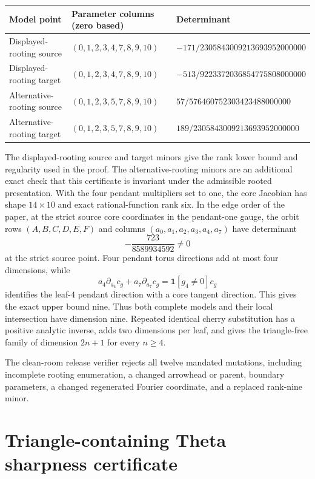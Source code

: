 \documentclass[11pt]{article}
\begin{document}
\begin{center}
\scriptsize
\begin{tabular}{@{}p{.25\linewidth}p{.30\linewidth}p{.34\linewidth}@{}}
\toprule
Model point & Parameter columns (zero based) & Determinant\\
\midrule
Displayed-rooting source
& $(0,1,2,3,4,7,8,9,10)$
& $-171/2305843009213693952000000$\\
Displayed-rooting target
& $(0,1,2,3,4,7,8,9,10)$
& $-513/9223372036854775808000000$\\
Alternative-rooting source
& $(0,1,2,3,5,7,8,9,10)$
& $57/576460752303423488000000$\\
Alternative-rooting target
& $(0,1,2,3,5,7,8,9,10)$
& $189/2305843009213693952000000$\\
\bottomrule
\end{tabular}
\end{center}
The displayed-rooting source and target minors give the rank lower bound and
regularity used in the proof.  The alternative-rooting minors are an
additional exact check that this certificate is invariant under the
admissible rooted presentation.
With the four pendant multipliers set to one, the core Jacobian has shape
$14\times10$ and exact rational-function rank six.  In the edge order of the
paper, at the strict source core coordinates in the pendant-one gauge, the
orbit rows $(A,B,C,D,E,F)$ and columns
$(a_0,a_1,a_2,a_3,a_4,a_7)$ have determinant
\[
-\frac{723}{8589934592}\ne0
\]
at the strict source point.  Four pendant torus directions add at most four
dimensions, while
\[
a_4\partial_{a_4}c_g+a_7\partial_{a_7}c_g
=\mathbf1[g_4\ne0]c_g
\]
identifies the leaf-$4$ pendant direction with a core tangent direction.
This gives the exact upper bound nine.  Thus both complete models and their
local intersection have dimension nine.  Repeated identical cherry
substitution has a positive analytic inverse, adds two dimensions per leaf,
and gives the triangle-free family of dimension $2n+1$ for every $n\ge4$.

The clean-room release verifier rejects all twelve mandated mutations,
including incomplete rooting enumeration, a changed arrowhead or parent,
boundary parameters, a changed regenerated Fourier coordinate, and a
replaced rank-nine minor.

\section{Triangle-containing Theta sharpness certificate}
\end{document}

